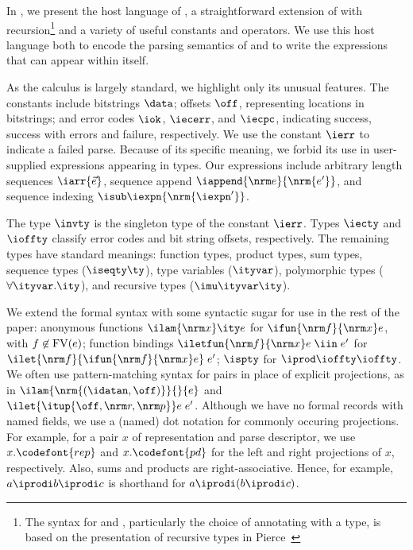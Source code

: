 In , we present the host language of
\ddc{}, a straightforward extension of \fomega{} with
recursion\footnote{The syntax for  and ,
  particularly the choice of annotating  with a type, is
  based on the presentation of recursive types in Pierce~\cite{pierce:tapl}} and a
variety of useful constants and operators. 
We use this host language both to encode the parsing semantics of
\ddc{} and to write the expressions that can appear within \ddc{}
itself.

As the calculus is largely standard, we highlight only its unusual
features. The constants include bitstrings $\data$; offsets $\off$,
representing locations in bitstrings; and error codes $\iok$,
$\iecerr$, and $\iecpc$, indicating success, success with errors and
failure, respectively. We use the constant $\ierr$ to indicate a
failed parse.  Because of its specific meaning, we forbid its use in
user-supplied expressions appearing in \ddc{} types.
Our expressions include arbitrary length
sequences $\iarr{\vec e}$, sequence append $\iappend {\nrm e}
{\nrm {e'}}$, and sequence indexing $\isub \iexpn {\nrm {\iexpn'}}$.

The type $\invty$ is the singleton type of the constant $\ierr$.
Types $\iecty$ and $\ioffty$ classify error codes and bit string
offsets, respectively. The remaining types have standard meanings:
function types, product types, sum types, sequence types ($\iseqty
\ty$), type variables ($\ityvar$), polymorphic types ($\forall
\ityvar.\ity$), and recursive types ($\imu \ityvar \ity$).

We extend the formal syntax with some syntactic sugar for use in the
rest of the paper: anonymous functions $\ilam {\nrm x} \ity e$ for
$\ifun {\nrm f} {\nrm x} e$, with $f \not\in {\rm FV}(e)$; function
bindings $\iletfun {\nrm f} {\nrm x} e \; \iin \; e'$ for $\ilet {\nrm
  f} {\ifun {\nrm f} {\nrm x} e} \; e'$; $\ispty$ for $\iprod \ioffty
\ioffty$.  
We often use pattern-matching syntax for pairs in place of
explicit projections, as in $\ilam {\nrm{(\idatan,\off)}}{}{e}$ and $\ilet
{\itup{\off,\nrm r,\nrm p}} e\; e'$.  Although we have no formal records with
named fields, we use a (named) dot notation for commonly occuring projections.
For example, for a pair $x$ of representation and parse descriptor, we use
$x.\codefont{rep}$ and $x.\codefont{pd}$ for the left and right
projections of $x$, respectively.  Also, sums and products are
right-associative. Hence, for example, $a \iprodi b \iprodi c$ is
shorthand for $a \iprodi (b \iprodi c)$.

